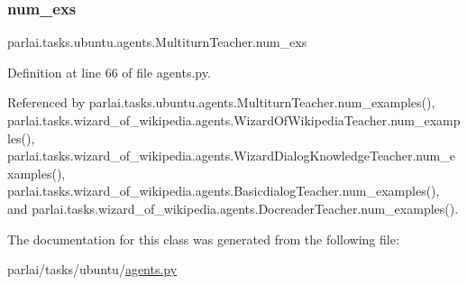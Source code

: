 \subsubsection{\texorpdfstring{num\+\_\+exs}{num\_exs}}
{\footnotesize\ttfamily parlai.\+tasks.\+ubuntu.\+agents.\+Multiturn\+Teacher.\+num\+\_\+exs}



Definition at line 66 of file agents.\+py.



Referenced by parlai.\+tasks.\+ubuntu.\+agents.\+Multiturn\+Teacher.\+num\+\_\+examples(), parlai.\+tasks.\+wizard\+\_\+of\+\_\+wikipedia.\+agents.\+Wizard\+Of\+Wikipedia\+Teacher.\+num\+\_\+examples(), parlai.\+tasks.\+wizard\+\_\+of\+\_\+wikipedia.\+agents.\+Wizard\+Dialog\+Knowledge\+Teacher.\+num\+\_\+examples(), parlai.\+tasks.\+wizard\+\_\+of\+\_\+wikipedia.\+agents.\+Basicdialog\+Teacher.\+num\+\_\+examples(), and parlai.\+tasks.\+wizard\+\_\+of\+\_\+wikipedia.\+agents.\+Docreader\+Teacher.\+num\+\_\+examples().



The documentation for this class was generated from the following file\+:\begin{DoxyCompactItemize}
\item 
parlai/tasks/ubuntu/\hyperlink{parlai_2tasks_2ubuntu_2agents_8py}{agents.\+py}\end{DoxyCompactItemize}
